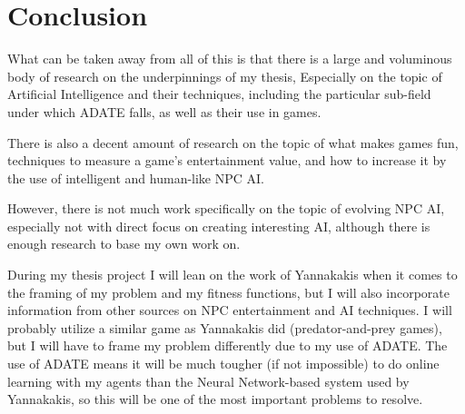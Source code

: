 \documentclass[]{report}
\begin{document}
\chapter{Conclusion}
\label{cha:conclusion}

What can be taken away from all of this is that there is a large and voluminous
body of research on the underpinnings of my thesis, Especially on the topic of
Artificial Intelligence and their techniques, including the particular sub-field
under which ADATE falls, as well as their use in games.

There is also a decent amount of research on the topic of what makes games fun,
techniques to measure a game's entertainment value, and how to increase it by
the use of intelligent and human-like NPC AI.

However, there is not much work specifically on the topic of evolving NPC AI,
especially not with direct focus on creating interesting AI, although there is
enough research to base my own work on.

During my thesis project I will lean on the work of Yannakakis
\citep{yannakakis2005ai} when it comes to the framing of my problem and my
fitness functions, but I will also incorporate information from other sources on
NPC entertainment and AI techniques. I will probably utilize a similar game
as Yannakakis did (predator-and-prey games), but I will have to frame my problem
differently due to my use of ADATE. The use of ADATE means it will be much
tougher (if not impossible) to do online learning with my agents than the Neural
Network-based system used by Yannakakis, so this will be one of the most
important problems to resolve.



\end{document}
